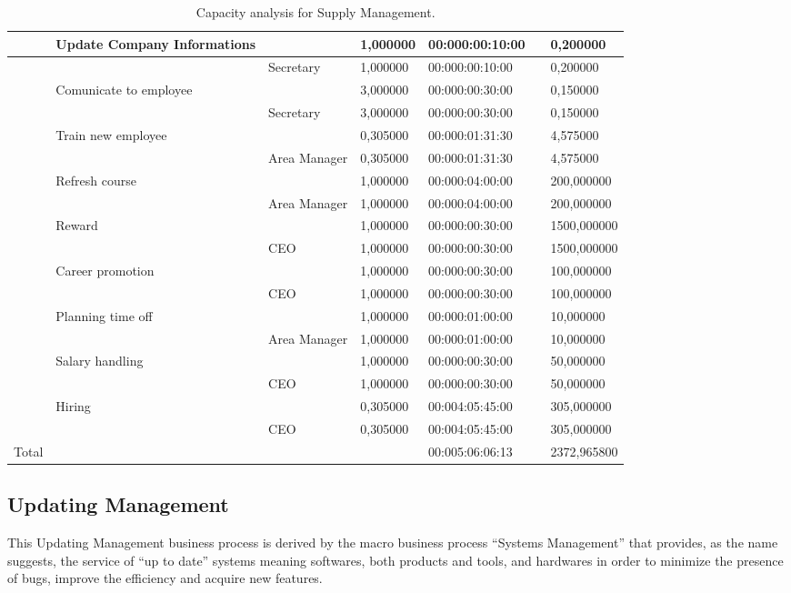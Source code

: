 \begin{landscape}
\begin{table}
{\begin{tabular}{|l|l|l|l|l|l|l|}
\hline
&Update Company Informations &&1,000000&00:000:00:10:00&&0,200000\\
\hline
&&Secretary &1,000000&00:000:00:10:00&&0,200000\\
\hline
&Comunicate to employee &&3,000000&00:000:00:30:00&&0,150000\\
\hline
&&Secretary &3,000000&00:000:00:30:00&&0,150000\\
\hline
&Train new employee &&0,305000&00:000:01:31:30&&4,575000\\
\hline
&&Area Manager &0,305000&00:000:01:31:30&&4,575000\\
\hline
&Refresh course &&1,000000&00:000:04:00:00&&200,000000\\
\hline
&&Area Manager &1,000000&00:000:04:00:00&&200,000000\\
\hline
&Reward &&1,000000&00:000:00:30:00&&1500,000000\\
\hline
&&CEO &1,000000&00:000:00:30:00&&1500,000000\\
\hline
&Career promotion &&1,000000&00:000:00:30:00&&100,000000\\
\hline
&&CEO &1,000000&00:000:00:30:00&&100,000000\\
\hline
&Planning time off &&1,000000&00:000:01:00:00&&10,000000\\
\hline
&&Area Manager &1,000000&00:000:01:00:00&&10,000000\\
\hline
&Salary handling &&1,000000&00:000:00:30:00&&50,000000\\
\hline
&&CEO &1,000000&00:000:00:30:00&&50,000000\\
\hline
&Hiring &&0,305000&00:004:05:45:00&&305,000000\\
\hline
&&CEO &0,305000&00:004:05:45:00&&305,000000\\
\hline
Total&&&&00:005:06:06:13&&2372,965800
\end{tabular}
}
\caption{Capacity analysis for Supply Management.}
\end{table}
\end{landscape}
%

%

\subsection{Updating Management}
This Updating Management business process is derived by the macro business process ``Systems Management'' that provides, as the name suggests, the service of ``up to date'' systems meaning softwares, both products and tools, and hardwares in order to minimize the presence of bugs, improve the efficiency and acquire new features.

